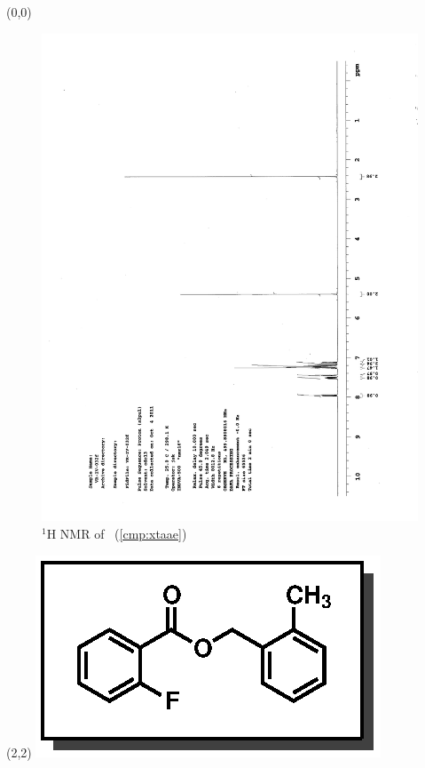 \begin{textblock}{20}(0,0)
\begin{figure}[htb]
\caption{$^1$H NMR of \CMPxtaae\ (\ref{cmp:xtaae})}
\includegraphics[scale=0.75, trim = 0mm 0mm 0mm 5mm,
clip]{chp_asymmetric/images/nmr/xtaaeH}
\vspace{-100pt}
\end{figure}
\end{textblock}
\begin{textblock}{1}(2,2)
\includegraphics[scale=0.8, angle=90]{chp_asymmetric/images/xtaae}
\end{textblock}
